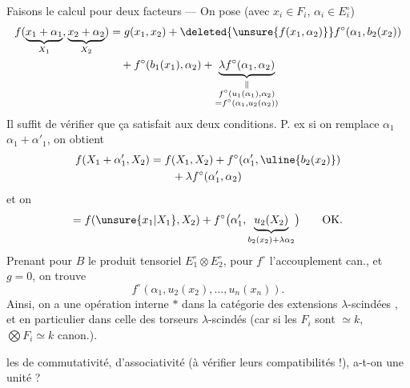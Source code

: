 Faisons le calcul pour deux facteurs ---
On pose (avec $x_i\in F_i$, $\alpha_i\in E_i^\circ$)
\[
\begin{aligned}
f(\underbrace{x_1+\alpha_1}_{X_1},\underbrace{x_2+\alpha_2}_{X_2})
 &=g(x_1,x_2)+\deleted{\unsure{f(x_1,\alpha_2)}}f^\circ(\alpha_1,b_2(x_2))\\
 &\quad+f^\circ(b_1(x_1),\alpha_2)
 +\underbrace{\lambda f^\circ(\alpha_1,\alpha_2)}_{\substack{\Vert\\f^\circ(u_1(\alpha_1),\alpha_2)\\=f^\circ(\alpha_1,u_2(\alpha_2))}}
\end{aligned}
\]
Il suffit de vérifier que ça satisfait aux deux conditions. P. ex si on remplace $\alpha_1$  $\alpha_1+\alpha'_1$, on obtient
\[
\begin{aligned}
f(X_1+\alpha'_1,X_2)&=f(X_1,X_2)+f^\circ(\alpha'_1,\uline{b_2(x_2)})\\
&\qquad+\lambda f^\circ(\alpha'_1,\alpha_2)
\end{aligned}
\]
et on 
\[
=f(\unsure{x_1|X_1},X_2)+f^\circ\bigl(\alpha'_1,\underbrace{u_2(X_2)}_{b_2(x_2)+\lambda\alpha_2}\bigr)\qquad\text{OK.}
\]
Prenant pour $B$ le produit tensoriel $E_1^\circ\otimes E_2^\circ$, pour $f^\circ$ l'accouplement can., et $g=0$, on trouve
\[
f^\circ(\alpha_1,u_2(x_2),\ldots,u_n(x_n)).
\]
Ainsi, on a une opération interne $*$ dans la catégorie des extensions $\lambda$-scindées , et en particulier dans celle des torseurs $\lambda$-scindés (car si les $F_i$ sont $\simeq k$, $\bigotimes F_i\simeq k$ canon.).

 les  de commutativité, d'associativité (à vérifier leurs compatibilités !), a-t-on une unité ?

